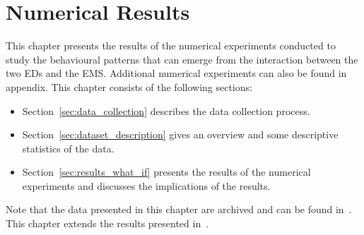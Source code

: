 \chapter{Numerical Results}\label{sec:numerical_results}

This chapter presents the results of the numerical experiments conducted to
study the behavioural patterns that can emerge from the interaction between the
two EDs and the EMS.
Additional numerical experiments can also be found in appendix.
This chapter consists of the following sections:
\begin{itemize}
    \item Section~\ref{sec:data_collection} describes the data collection
    process.
    \item Section~\ref{sec:dataset_description} gives an overview and some
    descriptive statistics of the data.
    \item Section~\ref{sec:results_what_if} presents the results of the
    numerical experiments and discusses the implications of the results.
\end{itemize}

Note that the data presented in this chapter are archived and can be found
in~\cite{michalis_panayides_2023_7555285}.
This chapter extends the results presented in~\cite{panayides2023game}.






